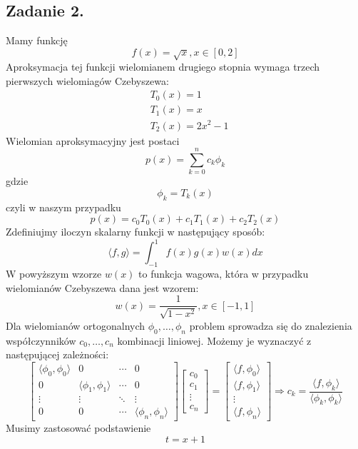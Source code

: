 \documentclass[11pt]{scrartcl}
\begin{document}
    \subsection{Zadanie 2.}
    Mamy funkcję
    \[
        f(x)=\sqrt{x},x \in [0,2]
    \]
    Aproksymacja tej funkcji wielomianem drugiego stopnia
    wymaga trzech pierwszych wielomiagów Czebyszewa:
    \begin{align*}
        & T_0(x) = 1 \\
        & T_1(x) = x \\
        & T_2(x) = 2x^2-1
    \end{align*}
    Wielomian aproksymacyjny jest postaci
    \[
        p(x)=\sum_{k=0}^{n}c_k\phi_k
    \]
    gdzie
    \[
        \phi_k=T_k(x)
    \]
    czyli w naszym przypadku
    \[
        p(x)=c_0T_0(x)+c_1T_1(x)+c_2T_2(x)
    \]
    Zdefiniujmy iloczyn skalarny funkcji w następujący sposób:
    \[
        \langle f,g \rangle =\int_{-1}^{1}f(x)g(x)w(x)dx
    \]
    W powyższym wzorze $w(x)$ to funkcja wagowa, która w przypadku
    wielomianów Czebyszewa dana jest wzorem:
    \[
        w(x)=\frac{1}{\sqrt{1-x^2}},x \in [-1,1]
    \]
    Dla wielomianów ortogonalnych $\phi_0,\ldots,\phi_n$
    problem sprowadza się do znalezienia współczynników
    $c_0,\ldots,c_n$ kombinacji liniowej. Możemy je wyznaczyć
    z następującej zależności:
    \[
        \begin{bmatrix}
            \langle \phi_0,\phi_0 \rangle & 0 & \cdots & 0 \\
            0 & \langle \phi_1,\phi_1 \rangle & \cdots & 0 \\
            \vdots & \vdots & \ddots & \vdots \\
            0 & 0 & \cdots & \langle \phi_n,\phi_n \rangle
        \end{bmatrix}
        \begin{bmatrix}
            c_0 \\
            c_1 \\
            \vdots \\
            c_n
        \end{bmatrix}
        =
        \begin{bmatrix}
            \langle f,\phi_0 \rangle \\
            \langle f,\phi_1 \rangle \\
            \vdots \\
            \langle f,\phi_n \rangle
        \end{bmatrix}
        \Rightarrow c_k=\frac{\langle f,\phi_k \rangle}{\langle
        \phi_k, \phi_k \rangle}
    \]
    Musimy zastosować podstawienie
    \[
        t=x+1
    \]
\end{document}
